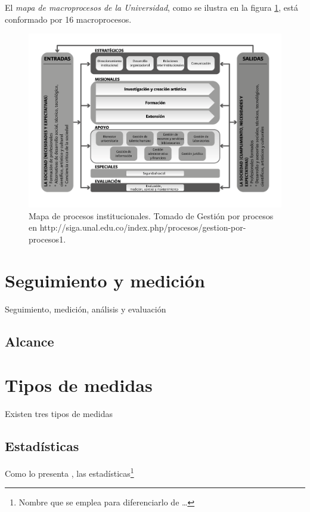 \documentclass[]{book}
\let\rmarkdownfootnote\footnote%
\def\footnote{\protect\rmarkdownfootnote}
\begin{document}
El \emph{mapa de macroprocesos de la Universidad}, como se ilustra en la
figura \ref{fig:fig2}, está conformado por 16 macroprocesos.

\begin{figure}

{\centering \includegraphics[width=0.8\linewidth]{Imagenes/F_2} 

}

\caption{Mapa de procesos institucionales. Tomado de Gestión por procesos en http://siga.unal.edu.co/index.php/procesos/gestion-por-procesos1.}\label{fig:fig2}
\end{figure}

\chapter{Seguimiento y medición}\label{medicion}

Seguimiento, medición, análisis y evaluación

\section{Alcance}\label{alcance}

\chapter{Tipos de medidas}\label{medidas}

Existen tres tipos de medidas

\section{Estadísticas}\label{estadisticas}

Como lo presenta \citet{Alberto2019}, las estadísticas\footnote{Nombre
  que se emplea para diferenciarlo de \ldots{}}
\end{document}

